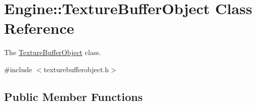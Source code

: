\hypertarget{classEngine_1_1TextureBufferObject}{}\section{Engine\+:\+:Texture\+Buffer\+Object Class Reference}
\label{classEngine_1_1TextureBufferObject}


The \hyperlink{classEngine_1_1TextureBufferObject}{Texture\+Buffer\+Object} class.  




{\ttfamily \#include $<$texturebufferobject.\+h$>$}

\subsection*{Public Member Functions}
